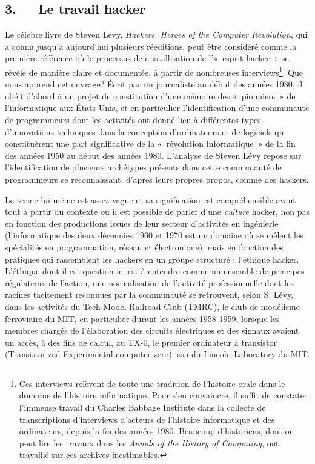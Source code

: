 \documentclass{FramateX}
\begin{document}
\begin{refsection}
\section*{3.~~~Le travail hacker}
{}

Le célèbre livre de Steven Levy, \textit{Hackers. Heroes of the Computer
Revolution}, qui a connu jusqu'à aujourd'hui plusieurs
rééditions, peut être considéré comme la première référence où le
processus de cristallisation de l'«~esprit hacker~» se révèle de
manière claire et documentée, à partir de nombreuses
interviews\footnote{Ces interviews relèvent de toute une tradition de
l'histoire orale dans le domaine de
l'histoire informatique. Pour s'en
convaincre, il suffit de constater l'immense travail
du Charles Babbage Institute dans la collecte de transcriptions
d'interviews d'acteurs de
l'histoire informatique et des ordinateurs, depuis la
fin des années 1980. Beaucoup d'historiens, dont on
peut lire les travaux dans les \textit{Annals of the History of
Computing}, ont travaillé sur ces archives inestimables.}. Que nous
apprend cet ouvrage? Écrit par un journaliste au début des années 1980,
il obéit d'abord à un projet de constitution
d'une mémoire des «~pionniers~» de
l'informatique aux États-Unis, et en particulier
l'identification d'une communauté de
programmeurs dont les activités ont donné lieu à différentes types
d'innovations techniques dans la conception
d'ordinateurs et de logiciels qui constituèrent une
part significative de la «~révolution informatique~» de la fin des
années 1950 au début des années 1980. L'analyse de
Steven Lévy repose sur l'identification de plusieurs
archétypes présents dans cette communauté de programmeurs se
reconnaissant, d'après leurs propres propos, comme des
hackers.

Le terme lui-même est assez vague et sa signification est compréhensible
avant tout à partir du contexte où il est possible de parler
d'une \textit{culture} hacker, non pas en fonction des
productions issues de leur secteur d'activités en
ingénierie (l'informatique des deux décennies 1960 et
1970 est un domaine où se mêlent les spécialités en programmation,
réseau et électronique), mais en fonction des pratiques qui rassemblent
les hackers en un groupe structuré : l'éthique hacker.
L'éthique dont il est question ici est à entendre
comme un ensemble de principes régulateurs de
l'action, une normalisation de
l'activité professionnelle dont les racines tacitement
reconnues par la communauté se retrouvent, selon S. Lévy, dans les
activités du Tech Model Railroad Club (TMRC), le club de modélisme
ferroviaire du MIT, en particulier durant les années 1958-1959, lorsque
les membres chargés de l'élaboration des circuits
électriques et des signaux avaient un accès, à des fins de calcul, au
TX-0, le premier ordinateur à transistor (Transistorized Experimental
computer zero) issu du Lincoln Laboratory du MIT. 


\end{refsection}
\end{document}
